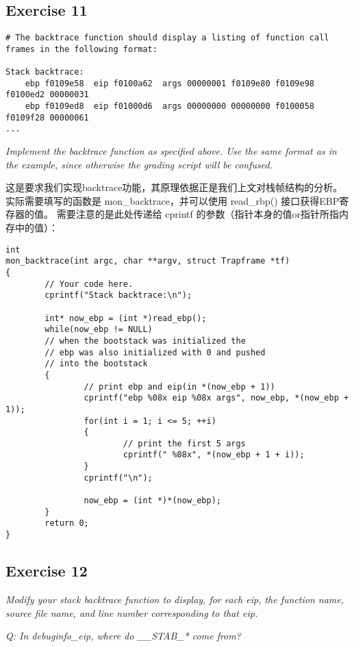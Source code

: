 \documentclass[12pt, letterpaper]{report}
\begin{document}
\newpage
\subsection{\large Exercise 11}

\lstset{style=AssemblyStyle}
\setmainfont{Consolas}
\begin{lstlisting}
# The backtrace function should display a listing of function call frames in the following format:

Stack backtrace:
    ebp f0109e58  eip f0100a62  args 00000001 f0109e80 f0109e98 f0100ed2 00000031
    ebp f0109ed8  eip f01000d6  args 00000000 00000000 f0100058 f0109f28 00000061
...
\end{lstlisting}
\setmainfont{Times New Roman}

\textsl{Implement the backtrace function as specified above. 
        Use the same format as in the example, since otherwise the grading script will be confused.} \par
\quad \par 
这是要求我们实现backtrace功能，其原理依据正是我们上文对栈帧结构的分析。
实际需要填写的函数是 mon\_backtrace，并可以使用 read\_rbp() 接口获得EBP寄存器的值。
需要注意的是此处传递给 cprintf 的参数（指针本身的值or指针所指内存中的值）：\par 
\lstset{style=CStyle}
\setmainfont{Consolas}
\begin{lstlisting}
int
mon_backtrace(int argc, char **argv, struct Trapframe *tf)
{
        // Your code here.
        cprintf("Stack backtrace:\n");

        int* now_ebp = (int *)read_ebp();
        while(now_ebp != NULL)
        // when the bootstack was initialized the 
        // ebp was also initialized with 0 and pushed
        // into the bootstack
        {
                // print ebp and eip(in *(now_ebp + 1))
                cprintf("ebp %08x eip %08x args", now_ebp, *(now_ebp + 1));
                for(int i = 1; i <= 5; ++i)
                {
                        // print the first 5 args
                        cprintf(" %08x", *(now_ebp + 1 + i));
                }
                cprintf("\n");

                now_ebp = (int *)*(now_ebp);
        }
        return 0;
}
\end{lstlisting}
\setmainfont{Times New Roman}
\quad \par 



\newpage
\subsection{\large Exercise 12}
\textsl{Modify your stack backtrace function to display, 
        for each eip, the function name, source file name, 
        and line number corresponding to that eip.} \par
\textsl{Q: In debuginfo\_eip, where do \_\_STAB\_* come from?} \par 
\end{document}

